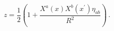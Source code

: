 \begin{equation}
z = \frac{1}{2} \left( 1 + \frac{X^a (x) X^b (x^{\prime}) \eta_{a b}}{R^2} \right) \, . \label{zi}
\end{equation}

